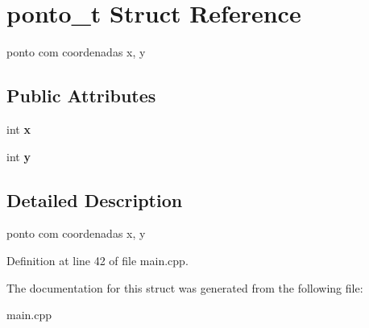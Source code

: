 \section{ponto\+\_\+t Struct Reference}
\label{structponto__t}


ponto com coordenadas x, y  


\subsection*{Public Attributes}
\begin{DoxyCompactItemize}
\item 
\mbox{\label{structponto__t_adafc315be0f22fe8ea89446bab20117d}} 
int {\bfseries x}
\item 
\mbox{\label{structponto__t_a588bdbb8294ab32da8999f5ab3320f1d}} 
int {\bfseries y}
\end{DoxyCompactItemize}


\subsection{Detailed Description}
ponto com coordenadas x, y 

Definition at line 42 of file main.\+cpp.



The documentation for this struct was generated from the following file\+:\begin{DoxyCompactItemize}
\item 
main.\+cpp\end{DoxyCompactItemize}

